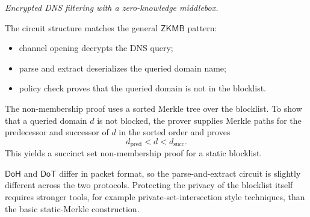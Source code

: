 \documentclass[11pt]{article}
\newcommand{\ZKMB}{\ensuremath{\mathsf{ZKMB}}}
\newcommand{\DoH}{\ensuremath{\mathsf{DoH}}}
\newcommand{\DoT}{\ensuremath{\mathsf{DoT}}}
\begin{document}
\begin{center}
\begin{minipage}{0.78\textwidth}
\centering
{}

\smallskip
\emph{Encrypted DNS filtering with a zero-knowledge middlebox.}
\end{minipage}
\end{center}

The circuit structure matches the general \ZKMB{} pattern:
\begin{itemize}
  \item channel opening decrypts the DNS query;
  \item parse and extract deserializes the queried domain name;
  \item policy check proves that the queried domain is not in the blocklist.
\end{itemize}

The non-membership proof uses a sorted Merkle tree over the blocklist.  To show
that a queried domain $d$ is not blocked, the prover supplies Merkle paths for
the predecessor and successor of $d$ in the sorted order and proves
\[
  d_{\mathrm{pred}} < d < d_{\mathrm{succ}}.
\]
This yields a succinct set non-membership proof for a static blocklist.

\begin{remark}
\DoH{} and \DoT{} differ in packet format, so the parse-and-extract circuit is
slightly different across the two protocols.  Protecting the privacy of the
blocklist itself requires stronger tools, for example private-set-intersection
style techniques, than the basic static-Merkle construction.
\end{remark}
\end{document}
